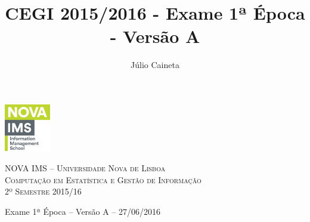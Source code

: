 \documentclass[addpoints]{exam}
\author{Júlio Caineta}
\title{CEGI 2015/2016 - Exame 1ª Época - Versão A}
\begin{document}
	
\noindent\begin{minipage}{0.2\textwidth}%
	\includegraphics[width=2cm]{logo.png}
\end{minipage}
\hfill
\begin{minipage}{0.8\textwidth}
	\begin{center}
		\textsc {\small NOVA IMS -- Universidade Nova de Lisboa} \\
		\textsc {Computação em Estatística e Gestão de Informação \\ 2º Semestre 2015/16}
	\end{center}
\end{minipage}

\begin{center}
	{\large Exame 1ª Época -- Versão A -- 27/06/2016}
\end{center}
 
\vspace{5mm}
\vspace{5mm}
\end{document}
